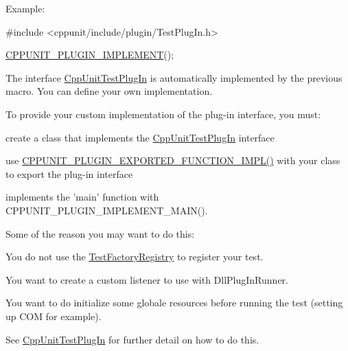 Example\+: 
\begin{DoxyCode}
\textcolor{preprocessor}{#include <cppunit/include/plugin/TestPlugIn.h>}

\hyperlink{group___writing_test_plug_in_ga705897c323d9381ac1b99a45e953e4ff}{CPPUNIT\_PLUGIN\_IMPLEMENT}();
\end{DoxyCode}


The interface \hyperlink{struct_cpp_unit_test_plug_in}{Cpp\+Unit\+Test\+Plug\+In} is automatically implemented by the previous macro. You can define your own implementation.

To provide your custom implementation of the plug-\/in interface, you must\+:
\begin{DoxyItemize}
\item create a class that implements the \hyperlink{struct_cpp_unit_test_plug_in}{Cpp\+Unit\+Test\+Plug\+In} interface
\item use \hyperlink{group___writing_test_plug_in_ga81bfba0323e2c7ca7dfd6767db813a5b}{C\+P\+P\+U\+N\+I\+T\+\_\+\+P\+L\+U\+G\+I\+N\+\_\+\+E\+X\+P\+O\+R\+T\+E\+D\+\_\+\+F\+U\+N\+C\+T\+I\+O\+N\+\_\+\+I\+M\+P\+L()} with your class to export the plug-\/in interface
\item implements the 'main' function with C\+P\+P\+U\+N\+I\+T\+\_\+\+P\+L\+U\+G\+I\+N\+\_\+\+I\+M\+P\+L\+E\+M\+E\+N\+T\+\_\+\+M\+A\+I\+N().
\end{DoxyItemize}

Some of the reason you may want to do this\+:
\begin{DoxyItemize}
\item You do not use the \hyperlink{class_test_factory_registry}{Test\+Factory\+Registry} to register your test.
\item You want to create a custom listener to use with Dll\+Plug\+In\+Runner.
\item You want to do initialize some globale resources before running the test (setting up C\+O\+M for example).
\end{DoxyItemize}

See \hyperlink{struct_cpp_unit_test_plug_in}{Cpp\+Unit\+Test\+Plug\+In} for further detail on how to do this.


